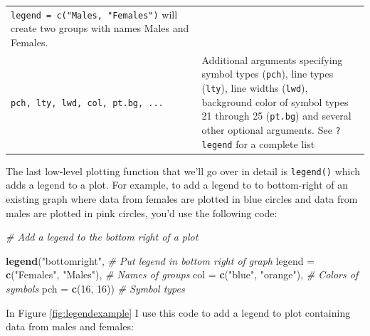 \documentclass[]{book}
\newenvironment{Shaded}{\begin{snugshade}}{\end{snugshade}}
\newcommand{\KeywordTok}[1]{\textcolor[rgb]{0.13,0.29,0.53}{\textbf{{#1}}}}
\newcommand{\DataTypeTok}[1]{\textcolor[rgb]{0.13,0.29,0.53}{{#1}}}
\newcommand{\DecValTok}[1]{\textcolor[rgb]{0.00,0.00,0.81}{{#1}}}
\newcommand{\StringTok}[1]{\textcolor[rgb]{0.31,0.60,0.02}{{#1}}}
\newcommand{\CommentTok}[1]{\textcolor[rgb]{0.56,0.35,0.01}{\textit{{#1}}}}
\newcommand{\NormalTok}[1]{{#1}}
\theoremstyle{definition}
\theoremstyle{definition}
\theoremstyle{remark}
\begin{document}
\begin{longtable}[]{@{}ll@{}}
\begin{minipage}[t]{0.71\columnwidth}
\texttt{legend\ =\ c("Males,\ "Females")} will create two groups with
names Males and Females.\strut
\end{minipage}\tabularnewline
\begin{minipage}[t]{0.14\columnwidth}\raggedright\strut
\texttt{pch,\ lty,\ lwd,\ col,\ pt.bg,\ ...}\strut
\end{minipage} & \begin{minipage}[t]{0.71\columnwidth}\raggedright\strut
Additional arguments specifying symbol types (\texttt{pch}), line types
(\texttt{lty}), line widths (\texttt{lwd}), background color of symbol
types 21 through 25 (\texttt{pt.bg}) and several other optional
arguments. See \texttt{?legend} for a complete list\strut
\end{minipage}\tabularnewline
\bottomrule
\end{longtable}

The last low-level plotting function that we'll go over in detail is
\texttt{legend()} which adds a legend to a plot. For example, to add a
legend to to bottom-right of an existing graph where data from females
are plotted in blue circles and data from males are plotted in pink
circles, you'd use the following code:

\begin{Shaded}
\begin{Highlighting}[]
\CommentTok{# Add a legend to the bottom right of a plot}

\KeywordTok{legend}\NormalTok{(}\StringTok{"bottomright"}\NormalTok{,                  }\CommentTok{# Put legend in bottom right of graph}
       \DataTypeTok{legend =} \KeywordTok{c}\NormalTok{(}\StringTok{"Females"}\NormalTok{, }\StringTok{"Males"}\NormalTok{), }\CommentTok{# Names of groups}
       \DataTypeTok{col =} \KeywordTok{c}\NormalTok{(}\StringTok{"blue"}\NormalTok{, }\StringTok{"orange"}\NormalTok{),      }\CommentTok{# Colors of symbols}
       \DataTypeTok{pch =} \KeywordTok{c}\NormalTok{(}\DecValTok{16}\NormalTok{, }\DecValTok{16}\NormalTok{))                }\CommentTok{# Symbol types}
\end{Highlighting}
\end{Shaded}

In Figure \ref{fig:legendexample} I use this code to add a legend to
plot containing data from males and females:
\end{document}
